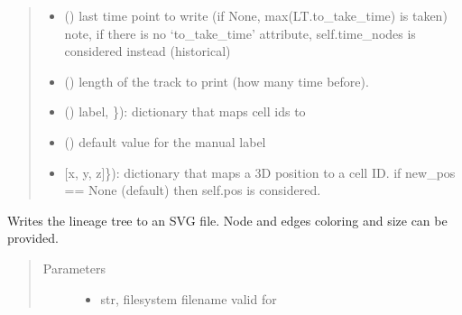 \documentclass[letterpaper,10pt,english]{sphinxmanual}
\begin{document}
\begin{fulllineitems}
\begin{fulllineitems}
\begin{quote}
\begin{description}
\begin{itemize}
\item {} 
 () \textendash{} last time point to write (if None, max(LT.to\_take\_time) is taken)
note, if there is no ‘to\_take\_time’ attribute, self.time\_nodes
is considered instead (historical)

\item {} 
 () \textendash{} length of the track to print (how many time before).

\item {} 
\sphinxstyleliteralstrong{\sphinxupquote{(}} () \textendash{} label, \}): dictionary that maps cell ids to

\item {} 
 () \textendash{} default value for the manual label

\item {} 
\sphinxstyleliteralstrong{\sphinxupquote{(}} \textendash{} {[}x, y, z{]}\}): dictionary that maps a 3D position to a cell ID.
if new\_pos == None (default) then self.pos is considered.

\end{itemize}

\end{description}\end{quote}

\end{fulllineitems}


\begin{fulllineitems}
\label{\detokenize{index:LineageTree.lineageTree.write_to_svg}}
Writes the lineage tree to an SVG file.
Node and edges coloring and size can be provided.
\begin{quote}\begin{description}
\item[{Parameters}] \leavevmode\begin{itemize}
\item {} 
 \textendash{} str, filesystem filename valid for 


\end{itemize}
\end{description}
\end{quote}
\end{fulllineitems}
\end{fulllineitems}
\end{document}
